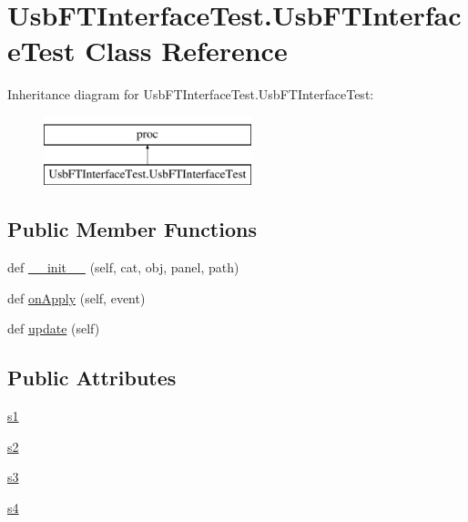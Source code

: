 \hypertarget{classUsbFTInterfaceTest_1_1UsbFTInterfaceTest}{}\section{Usb\+F\+T\+Interface\+Test.\+Usb\+F\+T\+Interface\+Test Class Reference}
\label{classUsbFTInterfaceTest_1_1UsbFTInterfaceTest}
Inheritance diagram for Usb\+F\+T\+Interface\+Test.\+Usb\+F\+T\+Interface\+Test\+:\begin{figure}[H]
\begin{center}
\leavevmode
\includegraphics[height=2.000000cm]{classUsbFTInterfaceTest_1_1UsbFTInterfaceTest}
\end{center}
\end{figure}
\subsection*{Public Member Functions}
\begin{DoxyCompactItemize}
\item 
def \hyperlink{classUsbFTInterfaceTest_1_1UsbFTInterfaceTest_ac4cc8069058c3e2930c0149b6af84718}{\+\_\+\+\_\+init\+\_\+\+\_\+} (self, cat, obj, panel, path)
\item 
def \hyperlink{classUsbFTInterfaceTest_1_1UsbFTInterfaceTest_a8e9351da77d0c0de7215d7dfb77399ad}{on\+Apply} (self, event)
\item 
def \hyperlink{classUsbFTInterfaceTest_1_1UsbFTInterfaceTest_a26ed6de82b73e6e0c54bb429262d3c75}{update} (self)
\end{DoxyCompactItemize}
\subsection*{Public Attributes}
\begin{DoxyCompactItemize}
\item 
\hyperlink{classUsbFTInterfaceTest_1_1UsbFTInterfaceTest_aa48c66e3bd6051de27610031425aa5ec}{s1}
\item 
\hyperlink{classUsbFTInterfaceTest_1_1UsbFTInterfaceTest_a38fa405de4975926328529eb221ac20d}{s2}
\item 
\hyperlink{classUsbFTInterfaceTest_1_1UsbFTInterfaceTest_a7a9156c9fcbfe6ae5eef76a407d3eb0e}{s3}
\item 
\hyperlink{classUsbFTInterfaceTest_1_1UsbFTInterfaceTest_ae2ffe3d7a87c993af4ff50c252dd742e}{s4}
\end{DoxyCompactItemize}


